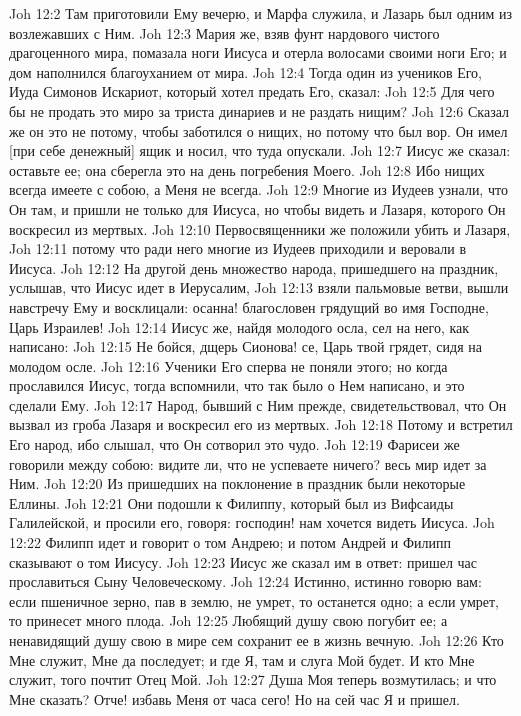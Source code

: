 Joh 12:2  Там приготовили Ему вечерю, и Марфа служила, и Лазарь был одним из возлежавших с Ним.
Joh 12:3  Мария же, взяв фунт нардового чистого драгоценного мира, помазала ноги Иисуса и отерла волосами своими ноги Его; и дом наполнился благоуханием от мира.
Joh 12:4  Тогда один из учеников Его, Иуда Симонов Искариот, который хотел предать Его, сказал:
Joh 12:5  Для чего бы не продать это миро за триста динариев и не раздать нищим?
Joh 12:6  Сказал же он это не потому, чтобы заботился о нищих, но потому что был вор. Он имел [при себе денежный] ящик и носил, что туда опускали.
Joh 12:7  Иисус же сказал: оставьте ее; она сберегла это на день погребения Моего.
Joh 12:8  Ибо нищих всегда имеете с собою, а Меня не всегда.
Joh 12:9  Многие из Иудеев узнали, что Он там, и пришли не только для Иисуса, но чтобы видеть и Лазаря, которого Он воскресил из мертвых.
Joh 12:10  Первосвященники же положили убить и Лазаря,
Joh 12:11  потому что ради него многие из Иудеев приходили и веровали в Иисуса.
Joh 12:12  На другой день множество народа, пришедшего на праздник, услышав, что Иисус идет в Иерусалим,
Joh 12:13  взяли пальмовые ветви, вышли навстречу Ему и восклицали: осанна! благословен грядущий во имя Господне, Царь Израилев!
Joh 12:14  Иисус же, найдя молодого осла, сел на него, как написано:
Joh 12:15  Не бойся, дщерь Сионова! се, Царь твой грядет, сидя на молодом осле.
Joh 12:16  Ученики Его сперва не поняли этого; но когда прославился Иисус, тогда вспомнили, что так было о Нем написано, и это сделали Ему.
Joh 12:17  Народ, бывший с Ним прежде, свидетельствовал, что Он вызвал из гроба Лазаря и воскресил его из мертвых.
Joh 12:18  Потому и встретил Его народ, ибо слышал, что Он сотворил это чудо.
Joh 12:19  Фарисеи же говорили между собою: видите ли, что не успеваете ничего? весь мир идет за Ним.
Joh 12:20  Из пришедших на поклонение в праздник были некоторые Еллины.
Joh 12:21  Они подошли к Филиппу, который был из Вифсаиды Галилейской, и просили его, говоря: господин! нам хочется видеть Иисуса.
Joh 12:22  Филипп идет и говорит о том Андрею; и потом Андрей и Филипп сказывают о том Иисусу.
Joh 12:23  Иисус же сказал им в ответ: пришел час прославиться Сыну Человеческому.
Joh 12:24  Истинно, истинно говорю вам: если пшеничное зерно, пав в землю, не умрет, то останется одно; а если умрет, то принесет много плода.
Joh 12:25  Любящий душу свою погубит ее; а ненавидящий душу свою в мире сем сохранит ее в жизнь вечную.
Joh 12:26  Кто Мне служит, Мне да последует; и где Я, там и слуга Мой будет. И кто Мне служит, того почтит Отец Мой.
Joh 12:27  Душа Моя теперь возмутилась; и что Мне сказать? Отче! избавь Меня от часа сего! Но на сей час Я и пришел.
